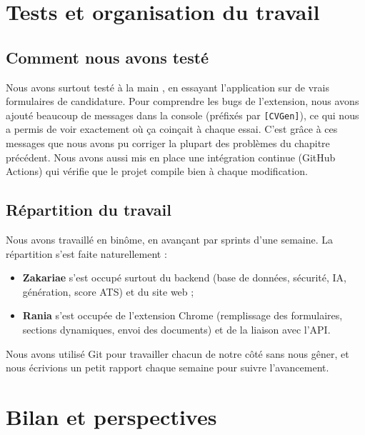 \documentclass[12pt,a4paper]{report}
\begin{document}
\chapter{Tests et organisation du travail}

\section{Comment nous avons test\'e}
Nous avons surtout test\'e \og \`a la main \fg{}, en essayant l'application sur de vrais
formulaires de candidature. Pour comprendre les bugs de l'extension, nous avons
ajout\'e beaucoup de messages dans la console (pr\'efix\'es par \texttt{[CVGen]}), ce
qui nous a permis de voir exactement o\`u \c{c}a coin\c{c}ait \`a chaque essai. C'est
gr\^ace \`a ces messages que nous avons pu corriger la plupart des probl\`emes du
chapitre pr\'ec\'edent. Nous avons aussi mis en place une int\'egration continue
(GitHub Actions) qui v\'erifie que le projet compile bien \`a chaque modification.

\section{R\'epartition du travail}
Nous avons travaill\'e en bin\^ome, en avan\c{c}ant par \og sprints \fg{} d'une semaine.
La r\'epartition s'est faite naturellement :
\begin{itemize}[leftmargin=1.4em, itemsep=2pt]
  \item \textbf{Zakariae} s'est occup\'e surtout du backend (base de donn\'ees,
  s\'ecurit\'e, IA, g\'en\'eration, score ATS) et du site web ;
  \item \textbf{Rania} s'est occup\'ee de l'extension Chrome (remplissage des
  formulaires, sections dynamiques, envoi des documents) et de la liaison avec
  l'API.
\end{itemize}
Nous avons utilis\'e Git pour travailler chacun de notre c\^ot\'e sans nous g\^ener, et
nous \'ecrivions un petit rapport chaque semaine pour suivre l'avancement.

\chapter{Bilan et perspectives}
\end{document}

